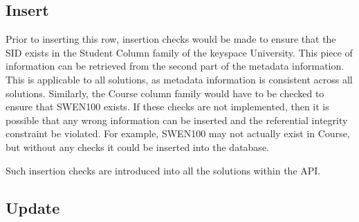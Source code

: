 \subsection{Insert}
Prior to inserting this row, insertion checks would be made to ensure
that the SID exists in the Student Column family of the keyspace University. This piece
of information can be retrieved from the second part of the metadata
information. This is applicable to all solutions, as metadata information is
consistent across all solutions. Similarly, the Course column family would have
to be checked to ensure that SWEN100 exists. If these checks are not
implemented, then it is possible that any wrong information can be inserted and
the referential integrity constraint be violated. For example, SWEN100 may not
actually exist in Course, but without any checks it could be inserted into the
database.

Such insertion checks are introduced into all the solutions within the API.

 \subsection{Update}
%

